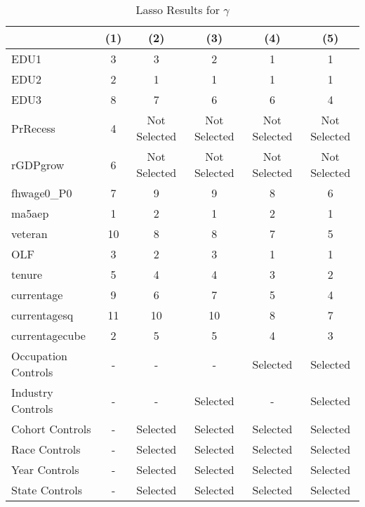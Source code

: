 \documentclass[12pt]{article}
\begin{document}
\begin{table}[H]
\centering
\caption{Lasso Results for $\gamma$}

\begin{tabular}{lccccc}

\toprule
                    & (1)     & (2)   & (3)    & (4)      & (5)         \\

\midrule
EDU1                &  3  &  3    &  2  &  1   &  1    \\
EDU2                &  2  &  1    &  1  &  1   &  1    \\
EDU3                &  8  &  7    &  6  &  6   &  4    \\
PrRecess            &  4    & Not Selected    & Not Selected   & Not Selected    & Not Selected     \\
rGDPgrow            &  6    & Not Selected     & Not Selected   & Not Selected    & Not Selected     \\
fhwage0\_P0         &  7   &  9     &  9   &  8    &  6     \\
ma5aep              &  1   &  2     &  1   &  2    &  1     \\
veteran             &  10   &  8     &  8   &  7    &  5     \\
OLF                 &  3   &  2     &  3   &  1    &  1     \\
tenure              &  5   &  4     &  4   &  3    &  2     \\
currentage          &  9   &  6     &  7   &  5    &  4     \\
currentagesq        &  11  &  10    &  10  &  8   &  7    \\
currentagecube      &  2  &  5    &  5  &  4   &  3    \\

\midrule
Occupation Controls      & -   & -    & -  & Selected   & Selected    \\
Industry Controls      & -  & -    & Selected  & -   & Selected    \\
Cohort Controls      & -  & Selected    & Selected  & Selected   & Selected    \\
Race Controls      & -  & Selected    & Selected  & Selected   & Selected    \\
Year Controls      & -  & Selected    & Selected  & Selected   & Selected    \\
State Controls      & -  & Selected    & Selected  & Selected   & Selected    \\



\end{tabular}
\end{table}
\end{document}
